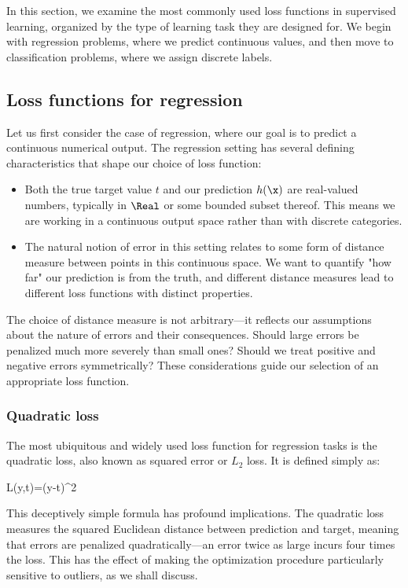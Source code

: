 In this section, we examine the most commonly used loss functions in supervised learning, organized by the type of learning task they are designed for. We begin with regression problems, where we predict continuous values, and then move to classification problems, where we assign discrete labels.

\subsection*{Loss functions for regression}

Let us first consider the case of \alert{regression}, where our goal is to predict a continuous numerical output. The regression setting has several defining characteristics that shape our choice of loss function:

\begin{itemize}
\item Both the true target value $t$ and our prediction $h(\x)$ are real-valued numbers, typically in $\Real$ or some bounded subset thereof. This means we are working in a continuous output space rather than with discrete categories.

\item The natural notion of error in this setting relates to some form of distance measure between points in this continuous space. We want to quantify "how far" our prediction is from the truth, and different distance measures lead to different loss functions with distinct properties.
\end{itemize}

The choice of distance measure is not arbitrary—it reflects our assumptions about the nature of errors and their consequences. Should large errors be penalized much more severely than small ones? Should we treat positive and negative errors symmetrically? These considerations guide our selection of an appropriate loss function.

\subsubsection*{Quadratic loss}

The most ubiquitous and widely used loss function for regression tasks is the \alert{quadratic loss}, also known as squared error or $L_2$ loss. It is defined simply as:
\begin{myequation}
L(y,t)=(y-t)^2
\end{myequation} 

This deceptively simple formula has profound implications. The quadratic loss measures the squared Euclidean distance between prediction and target, meaning that errors are penalized quadratically—an error twice as large incurs four times the loss. This has the effect of making the optimization procedure particularly sensitive to outliers, as we shall discuss.

